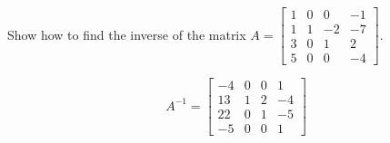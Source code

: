 
\begin{exerciseStatement}


Show how to find the inverse of the matrix \(A= \left[\begin{array}{cccc}
1 & 0 & 0 & -1 \\
1 & 1 & -2 & -7 \\
3 & 0 & 1 & 2 \\
5 & 0 & 0 & -4
\end{array}\right] \).


\end{exerciseStatement}
    
\begin{exerciseAnswer} 
\[A^{-1}= \left[\begin{array}{cccc}
-4 & 0 & 0 & 1 \\
13 & 1 & 2 & -4 \\
22 & 0 & 1 & -5 \\
-5 & 0 & 0 & 1
\end{array}\right] \]
\end{exerciseAnswer}
    
